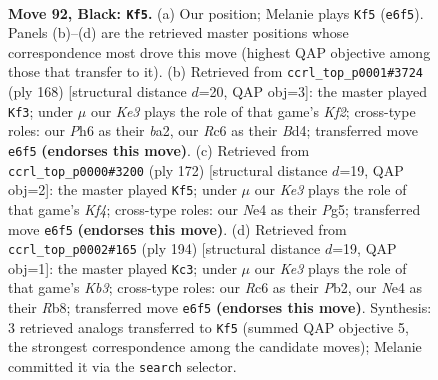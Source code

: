 \documentclass[11pt]{article}
\begin{document}
\clearpage

\begin{figure}[p]\centering
\begin{subfigure}{0.46\textwidth}\centering
\resizebox{\linewidth}{!}{%
\newchessgame
\chessboard[
  setfen={6R1/8/2r1k2p/4p3/1K1pn2b/8/8/8 b - - 3 92},
  showmover=false,
  pgfstyle=straightmove, color=movearrow, markmove={e6-f5}
]}
\caption{}
\end{subfigure}\hfill
\begin{subfigure}{0.46\textwidth}\centering
\resizebox{\linewidth}{!}{%
\newchessgame
\chessboard[
  setfen={6k1/8/6pP/6P1/3B4/6P1/b4K2/8 w - - 13 85},
  showmover=false,
  pgfstyle=straightmove, color=movearrow, markmove={f2-f3}
]}
\caption{}
\end{subfigure}
\\[4pt]
\begin{subfigure}{0.46\textwidth}\centering
\resizebox{\linewidth}{!}{%
\newchessgame
\chessboard[
  setfen={8/r5k1/8/6Pp/2R2K1P/8/8/8 w - - 1 87},
  showmover=false,
  pgfstyle=straightmove, color=movearrow, markmove={f4-f5}
]}
\caption{}
\end{subfigure}\hfill
\begin{subfigure}{0.46\textwidth}\centering
\resizebox{\linewidth}{!}{%
\newchessgame
\chessboard[
  setfen={1R6/8/2p5/k7/7r/PK6/1P6/8 w - - 15 98},
  showmover=false,
  pgfstyle=straightmove, color=movearrow, markmove={b3-c3}
]}
\caption{}
\end{subfigure}
\caption{\textbf{Move 92, Black: \texttt{Kf5}.} (a) Our position; Melanie plays \texttt{Kf5} (\texttt{e6f5}). Panels (b)--(d) are the retrieved master positions whose correspondence most drove this move (highest QAP objective among those that transfer to it). (b) Retrieved from \texttt{ccrl\_top\_p0001\#3724} (ply 168) [structural distance $d$=20, QAP obj=3]: the master played \texttt{Kf3}; under $\mu$ our \emph{Ke3} plays the role of that game's \emph{Kf2}; cross-type roles: our \emph{P}h6 as their \emph{b}a2, our \emph{R}c6 as their \emph{B}d4; transferred move \texttt{e6f5} \textbf{(endorses this move)}. (c) Retrieved from \texttt{ccrl\_top\_p0000\#3200} (ply 172) [structural distance $d$=19, QAP obj=2]: the master played \texttt{Kf5}; under $\mu$ our \emph{Ke3} plays the role of that game's \emph{Kf4}; cross-type roles: our \emph{N}e4 as their \emph{P}g5; transferred move \texttt{e6f5} \textbf{(endorses this move)}. (d) Retrieved from \texttt{ccrl\_top\_p0002\#165} (ply 194) [structural distance $d$=19, QAP obj=1]: the master played \texttt{Kc3}; under $\mu$ our \emph{Ke3} plays the role of that game's \emph{Kb3}; cross-type roles: our \emph{R}c6 as their \emph{P}b2, our \emph{N}e4 as their \emph{R}b8; transferred move \texttt{e6f5} \textbf{(endorses this move)}. Synthesis: 3 retrieved analogs transferred to \texttt{Kf5} (summed QAP objective 5, the strongest correspondence among the candidate moves); Melanie committed it via the \texttt{search} selector.}
\label{fig:thought-m183}
\end{figure}
\end{document}
